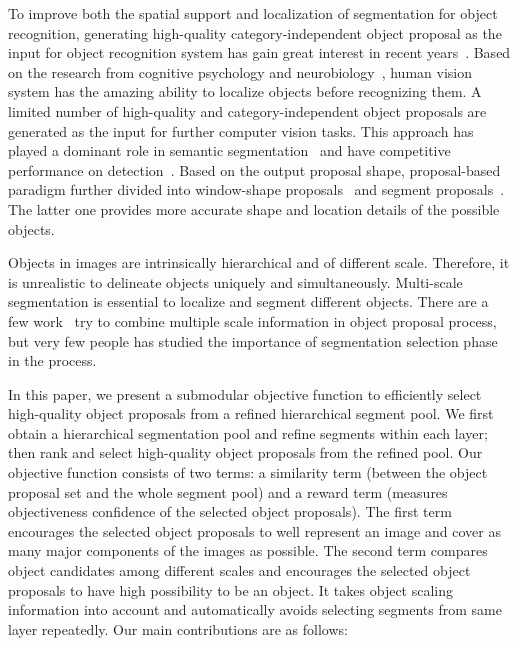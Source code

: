 \documentclass[10pt,twocolumn,letterpaper]{article}
\begin{document}
To improve both the spatial support and localization of segmentation for object recognition, generating high-quality category-independent object proposal as the input for object recognition system has gain great interest in recent years~\cite{Endres14, Uijlings13, Cheng14, Arbelaez14}. Based on the research from cognitive psychology and neurobiology~\cite{Teuber55, Wolfe04, Desimone95, Koch85}, human vision system has the amazing ability to localize objects before recognizing them. A limited number of high-quality and category-independent object proposals are generated as the input for further computer vision tasks. This approach has played a dominant role in semantic segmentation~\cite{Arbelaez12, Carreira12ECCV} and have competitive performance on detection~\cite{Fidler13}. Based on the output proposal shape, proposal-based paradigm further divided into window-shape proposals~\cite{Zitnick14, Cheng14, Uijlings13} and segment proposals~\cite{Arbelaez14, Endres14, Singh14}. The latter one provides more accurate shape and location details of the possible objects.

Objects in images are intrinsically hierarchical and of different scale. Therefore, it is unrealistic to delineate objects uniquely and simultaneously. Multi-scale segmentation is essential to localize and segment different objects. There are a few work~\cite{Uijlings13, Arbelaez14} try to combine multiple scale information in object proposal process, but very few people has studied the importance of segmentation selection phase in the process. 

In this paper, we present a submodular objective function to efficiently select high-quality object proposals from a refined hierarchical segment pool. We first obtain a hierarchical segmentation pool and refine segments within each layer; then rank and select high-quality object proposals from the refined pool. Our objective function consists of two terms: a similarity term (between the object proposal set and the whole segment pool) and a reward term (measures objectiveness confidence of the selected object proposals). The first term encourages the selected object proposals to well represent an image and cover as many major components of the images as possible. The second term compares object candidates among different scales and encourages the selected object proposals to have high possibility to be an object. It takes object scaling information into account and automatically avoids selecting segments from same layer repeatedly. Our main contributions are as follows:
\end{document}
